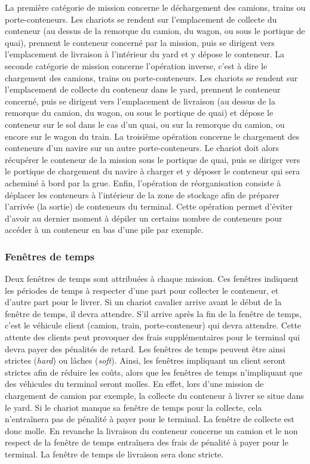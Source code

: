 La première catégorie de mission concerne le déchargement des camions, trains ou porte-conteneurs. Les chariots se rendent sur l'emplacement de collecte du conteneur (au dessus de la remorque du camion, du wagon, ou sous le portique de quai), prennent le conteneur concerné par la mission, puis se dirigent vers l'emplacement de livraison à l'intérieur du yard et y dépose le conteneur.
La seconde catégorie de mission concerne l'opération inverse, c'est à dire le chargement des camions, trains ou porte-conteneurs. Les chariots se rendent sur l'emplacement de collecte du conteneur dans le yard, prennent le conteneur concerné, puis se dirigent vers l'emplacement de livraison (au dessus de la remorque du camion, du wagon, ou sous le portique de quai) et dépose le conteneur sur le sol dans le cas d'un quai, ou sur la remorque du camion, ou encore sur le wagon du train.
La troisième opération concerne le chargement des conteneurs d'un navire sur un autre porte-conteneurs. Le chariot doit alors récupérer le conteneur de la mission sous le portique de quai, puis se diriger vers le portique de chargement du navire à charger et y déposer le conteneur qui sera acheminé à bord par la grue.
Enfin, l'opération de réorganisation consiste à déplacer les conteneurs à l'intérieur de la zone de stockage afin de préparer l'arrivée (la sortie) de conteneurs du terminal. Cette opération permet d'éviter d'avoir au dernier moment à dépiler un certains nombre de conteneurs pour accéder à un conteneur en bas d'une pile par exemple.

\subsubsection{Fenêtres de temps}

Deux fenêtres de temps sont attribuées à chaque mission. Ces fenêtres indiquent les périodes de temps à respecter d'une part pour collecter le conteneur, et d'autre part pour le livrer.
Si un chariot cavalier arrive avant le début de la fenêtre de temps, il devra attendre. S'il arrive après la fin de la fenêtre de temps, c'est le véhicule client (camion, train, porte-conteneur) qui devra attendre. Cette attente des clients peut provoquer des frais supplémentaires pour le terminal qui devra payer des pénalités de retard. Les fenêtres de temps peuvent être ainsi strictes (\textit{hard}) ou lâches (\textit{soft}). 
Ainsi, les fenêtres impliquant un client seront strictes afin de réduire les coûts, alors que les fenêtres de temps n'impliquant que des véhicules du terminal seront molles. En effet, lors d'une mission de chargement de camion par exemple, la collecte du conteneur à livrer se situe dans le yard. Si le chariot manque sa fenêtre de temps pour la collecte, cela n'entraînera pas de pénalité à payer pour le 
terminal.
La fenêtre de collecte est donc molle. En revanche la livraison du conteneur concerne un camion et le non respect de la fenêtre de temps entraînera des frais de pénalité à payer pour le terminal. La fenêtre de temps de livraison sera donc stricte.

